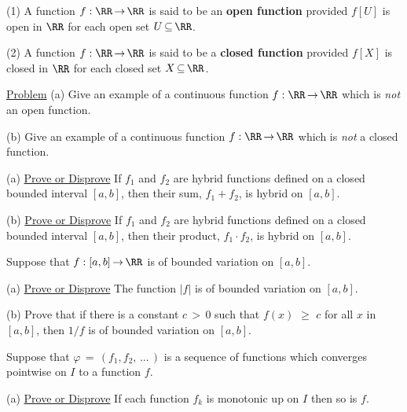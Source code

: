 \V
\V

\noindent {} (1) A function $f:{\RR} \,{\rightarrow}\, {\RR}$ is said to be an {\bf open function} provided $f[U]$ is open in ${\RR}$ for each open set $U \,{\subseteq}\, {\RR}$.

\V

        (2) A function $f:{\RR} \,{\rightarrow}\, {\RR}$ is said to be a {\bf closed function} provided $f[X]$ is closed in ${\RR}$ for each closed set $X \,{\subseteq}\, {\RR}$.

\V

        \underline{Problem} (a) Give an example of a continuous function $f:{\RR} \,{\rightarrow}\, {\RR}$ which is {\em not} an open function.

\V

        (b) Give an example of a continuous function $f:{\RR} \,{\rightarrow}\, {\RR}$ which is {\em not} a closed function.

\V
\V

\noindent \ExFt (a) \underline{Prove or Disprove} If $f_{1}$ and $f_{2}$ are hybrid functions defined on a closed bounded interval $[a,b]$, then their sum, $f_{1} + f_{2}$, is hybrid on $[a,b]$.

\V

        (b) \underline{Prove or Disprove} If $f_{1}$ and $f_{2}$ are hybrid functions defined on a closed bounded interval $[a,b]$, then their product, $f_{1} {\cdot} f_{2}$, is hybrid on $[a,b]$.

\V
\V

\noindent \ExFu Suppose that $f:[a,b] \,{\rightarrow}\, {\RR}$ is of bounded variation on $[a,b]$.

\V

        (a) \underline{Prove or Disprove} The function $|f|$ is of bounded variation on $[a,b]$.

\V

        (b) Prove that if there is a constant $c\,>\,0$ such that $f(x)\,\,{\geq}\,\,c$ for all $x$ in $[a,b]$,
    then $1/f$ is of bounded variation on $[a,b]$.

\V
\V

\noindent \ExFv Suppose that ${\varphi} \,=\, (f_{1},f_{2},\,{\ldots}\,)$ is a sequence of functions which converges pointwise on $I$ to a function $f$.

\V

        (a) \underline{Prove or Disprove} If each function $f_{k}$ is monotonic up on $I$ then so is $f$.

